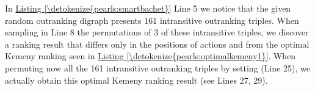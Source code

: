 \documentclass[a4paper,12pt,english]{sphinxhowto}
\begin{document}
\begin{sphinxVerbatim}[commandchars=\\\{\},numbers=left,firstnumber=1,stepnumber=1]
  
\end{sphinxVerbatim}
\sphinxresetverbatimhllines

\sphinxAtStartPar
In \hyperref[\detokenize{pearls:smartbachet}]{Listing \ref{\detokenize{pearls:smartbachet}}} Line 5 we notice that the given random outranking digraph presents 161 intransitive outranking triples. When sampling in Line 8 the permutations of 3 of these intransitive triples, we discover a ranking result that differs only in the positions of actions  and  from the optimal Kemeny ranking seen in \hyperref[\detokenize{pearls:optimalkemeny1}]{Listing \ref{\detokenize{pearls:optimalkemeny1}}}. When permuting now all the 161 intransitive outranking triples by setting  (Line 25), we actually obtain this optimal Kemeny ranking result (see Lines 27, 29).
\end{document}
